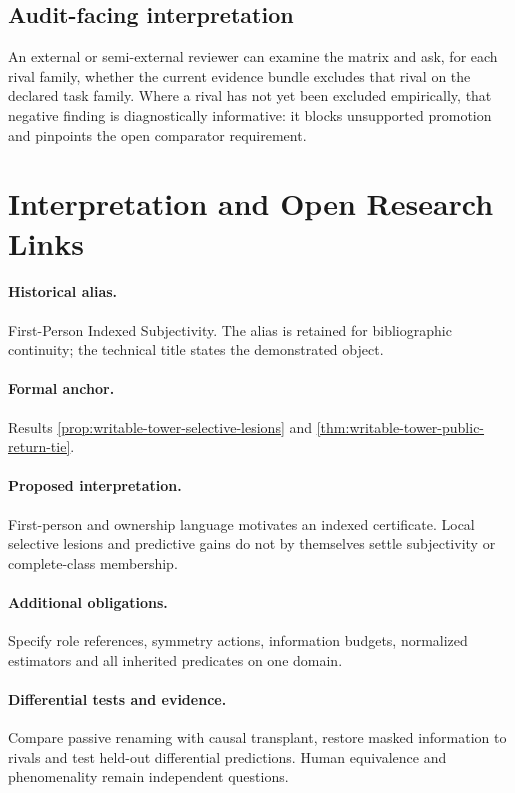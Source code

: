 \documentclass[11pt,a4paper]{article}
\theoremstyle{definition}
\begin{document}
\subsection{Audit-facing interpretation}
An external or semi-external reviewer can examine the matrix and ask, for each rival family, whether the current evidence bundle excludes that rival on the declared task family. Where a rival has not yet been excluded empirically, that negative finding is diagnostically informative: it blocks unsupported promotion and pinpoints the open comparator requirement.

\section{Interpretation and Open Research Links}\label{sec:interpretation-open-links}
\paragraph{Historical alias.} First-Person Indexed Subjectivity. The alias is retained for bibliographic continuity; the technical title states the demonstrated object.

\paragraph{Formal anchor.} Results \ref{prop:writable-tower-selective-lesions} and \ref{thm:writable-tower-public-return-tie}.

\paragraph{Proposed interpretation.} First-person and ownership language motivates an indexed certificate. Local selective lesions and predictive gains do not by themselves settle subjectivity or complete-class membership.

\paragraph{Additional obligations.} Specify role references, symmetry actions, information budgets, normalized estimators and all inherited predicates on one domain.

\paragraph{Differential tests and evidence.} Compare passive renaming with causal transplant, restore masked information to rivals and test held-out differential predictions. Human equivalence and phenomenality remain independent questions.
\end{document}
